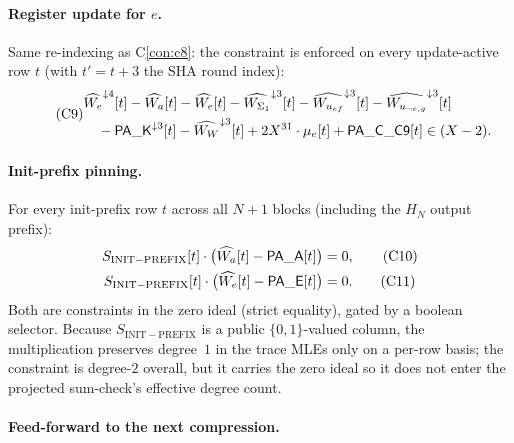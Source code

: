 \paragraph{Register update for $e$.}

Same re-indexing as C\ref{con:c8}: the constraint is enforced on
every update-active row $t$ (with $t' = t + 3$ the SHA round
index):
\begin{equation}\tag{C9}\label{con:c9}
\begin{aligned}
&\widehat{W_e}^{\downarrow 4}[t]
  - \widehat{W_a}[t]
  - \widehat{W_e}[t]
  - \widehat{W_{\Sigma_1}}^{\downarrow 3}[t]
  - \widehat{W_{u_{ef}}}^{\downarrow 3}[t]
  - \widehat{W_{u_{\neg e,g}}}^{\downarrow 3}[t] \\
&\quad - \mathsf{PA\_K}^{\downarrow 3}[t]
  - \widehat{W_W}^{\downarrow 3}[t]
  + 2X^{31} \cdot \mu_e[t] + \mathsf{PA\_C\_C9}[t] \in (X-2).
\end{aligned}
\end{equation}

\paragraph{Init-prefix pinning.}

For every init-prefix row $t$ across all $N+1$ blocks (including the
$H_N$ output prefix):
\begin{align}
S_{\mathrm{INIT-PREFIX}}[t] \cdot \bigl(\widehat{W_a}[t] - \mathsf{PA\_A}[t]\bigr) &= 0, \tag{C10}\label{con:c10}\\
S_{\mathrm{INIT-PREFIX}}[t] \cdot \bigl(\widehat{W_e}[t] - \mathsf{PA\_E}[t]\bigr) &= 0. \tag{C11}\label{con:c11}
\end{align}
Both are constraints in the zero ideal (strict equality), gated by a
boolean selector. Because $S_{\mathrm{INIT-PREFIX}}$ is a public
$\{0,1\}$-valued column, the multiplication preserves degree~$1$ in
the trace MLEs only on a per-row basis; the constraint is degree-$2$
overall, but it carries the zero ideal so it does not enter the
projected sum-check's effective degree count.

\paragraph{Feed-forward to the next compression.}

